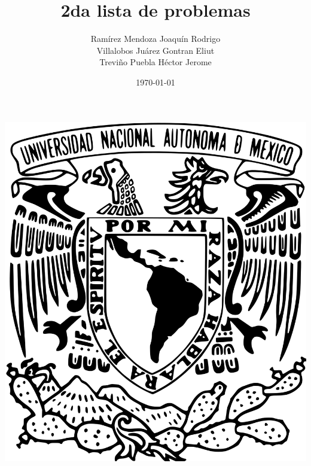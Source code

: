 \documentclass[oneside]{book}
\title{2da lista de problemas}
\author{Ramírez Mendoza Joaquín Rodrigo\\
Villalobos Juárez Gontran Eliut\\
Treviño Puebla Héctor Jerome}
\date{\today}
\begin{document}
    \begin{titlepage}

    \begin{minipage}{3cm}
    	\begin{center}
    		\includegraphics[height = 0.14\textheight]{recursos/Logo_UNAM.png}\par
    	\end{center}
    \end{minipage}\hfill
    \begin{minipage}{10cm}
    	

\end{minipage}
\end{titlepage}
\end{document}
